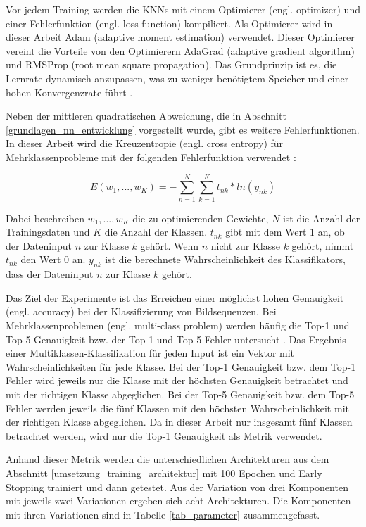 Vor jedem Training werden die \acp{KNN} mit einem Optimierer (engl. optimizer) und einer Fehlerfunktion (engl. loss function) kompiliert. Als Optimierer wird in dieser Arbeit Adam (adaptive moment estimation) verwendet. Dieser Optimierer vereint die Vorteile von den Optimierern AdaGrad (adaptive gradient algorithm) und RMSProp (root mean square propagation). Das Grundprinzip ist es, die Lernrate dynamisch anzupassen, was zu weniger benötigtem Speicher und einer hohen Konvergenzrate führt \cite{kingma2014adam}.

 Neben der mittleren quadratischen Abweichung, die in Abschnitt \ref{grundlagen_nn_entwicklung} vorgestellt wurde, gibt es weitere Fehlerfunktionen. In dieser Arbeit wird die Kreuzentropie (engl. cross entropy) für Mehrklassenprobleme mit der folgenden Fehlerfunktion verwendet \cite{bishop2006pattern}:

\begin{equation}
E(w_1, ..., w_K) = -\sum _{n=1}^N \sum _{k=1}^K t_{nk} * ln(y_{nk})
\end{equation}

Dabei beschreiben $w_1, ..., w_K$ die zu optimierenden Gewichte, $N$ ist die Anzahl der Trainingsdaten und $K$ die Anzahl der Klassen. $t_{nk}$ gibt mit dem Wert $1$ an, ob der Dateninput $n$ zur Klasse $k$ gehört. Wenn $n$ nicht zur Klasse $k$ gehört, nimmt $t_{nk}$ den Wert $0$ an. $y_{nk}$ ist die berechnete Wahrscheinlichkeit des Klassifikators, dass der Dateninput $n$ zur Klasse $k$ gehört.

Das Ziel der Experimente ist das Erreichen einer möglichst hohen Genauigkeit (engl. accuracy) bei der Klassifizierung von Bildsequenzen. Bei Mehrklassenproblemen (engl. multi-class problem) werden häufig die Top-1 und Top-5 Genauigkeit bzw. der Top-1 und Top-5 Fehler untersucht \cite{szegedy2016inception, simonyan2014vgg, chollet2017xception}. Das Ergebnis einer Multiklassen-Klassifikation für jeden Input ist ein Vektor mit Wahrscheinlichkeiten für jede Klasse. Bei der Top-1 Genauigkeit bzw. dem Top-1 Fehler wird jeweils nur die Klasse mit der höchsten Genauigkeit betrachtet und mit der richtigen Klasse abgeglichen. Bei der Top-5 Genauigkeit bzw. dem Top-5 Fehler werden jeweils die fünf Klassen mit den höchsten Wahrscheinlichkeit mit der richtigen Klasse abgeglichen. Da in dieser Arbeit nur insgesamt fünf Klassen betrachtet werden, wird nur die Top-1 Genauigkeit als Metrik verwendet.

Anhand dieser Metrik werden die unterschiedlichen Architekturen aus dem Abschnitt \ref{umsetzung_training_architektur} mit 100 Epochen und Early Stopping trainiert und dann getestet. Aus der Variation von drei Komponenten mit jeweils zwei Variationen ergeben sich acht Architekturen. Die Komponenten mit ihren Variationen sind in Tabelle \ref{tab_parameter} zusammengefasst.

